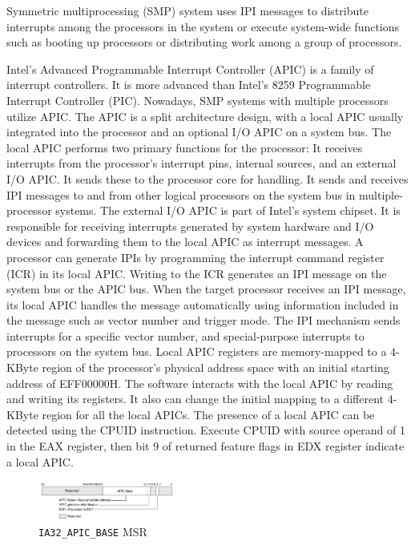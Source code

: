 Symmetric multiprocessing (SMP) system uses IPI messages to distribute interrupts among the processors in the system or execute system-wide functions such as booting up processors or distributing work among a group of processors. 

Intel's Advanced Programmable Interrupt Controller (APIC) is a family of interrupt controllers. It is more advanced than Intel's 8259 Programmable Interrupt Controller (PIC). Nowadays, SMP systems with multiple processors utilize APIC. The APIC is a split architecture design, with a local APIC usually integrated into the processor and an optional I/O APIC on a system bus. The local APIC performs two primary functions for the processor:
It receives interrupts from the processor's interrupt pins, internal sources, and an external I/O APIC. It sends these to the processor core for handling.
It sends and receives IPI messages to and from other logical processors on the system bus in multiple-processor systems.
The external I/O APIC is part of Intel's system chipset. It is responsible for receiving interrupts generated by system hardware and I/O devices and forwarding them to the local APIC as interrupt messages. A processor can generate IPIs by programming the interrupt command register (ICR) in its local APIC. Writing to the ICR generates an IPI message on the system bus or the APIC bus. When the target processor receives an IPI message, its local APIC handles the message automatically using information included in the message such as vector number and trigger mode. The IPI mechanism sends interrupts for a specific vector number, and special-purpose interrupts to processors on the system bus. Local APIC registers are memory-mapped to a 4-KByte region of the processor's physical address space with an initial starting address of EFF00000H. The software interacts with the local APIC by reading and writing its registers. It also can change the initial mapping to a different 4-KByte region for all the local APICs. The presence of a local APIC can be detected using the CPUID instruction. Execute CPUID with source operand of 1 in the EAX register, then bit 9 of returned feature flags in EDX register indicate a local APIC.


\begin{figure}[th]
  \includegraphics[width=0.40\textwidth]{figures/ia32apicbase}
  \centering
  \caption{\texttt{IA32\_APIC\_BASE} MSR}
  \label{fig:ia32apicbase}
\end{figure}

